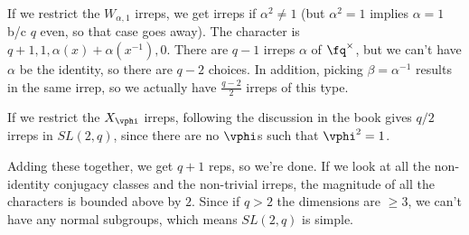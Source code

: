 \documentclass{article}
\begin{document}
If we restrict the $W_{\alpha, 1}$ irreps, we get irreps if $\alpha^2\neq 1$ (but $\alpha^2=1$ implies $\alpha=1$ b/c $q$ even, so that case goes away). The character is $q+1, 1, \alpha(x)+\alpha(x^{-1}), 0$. There are $q-1$ irreps $\alpha$ of $\fq^\times$, but we can't have $\alpha$ be the identity, so there are $q-2$ choices. In addition, picking $\beta=\alpha^{-1}$ results in the same irrep, so we actually have $\frac{q-2}{2}$ irreps of this type.

If we restrict the $X_\vphi$ irreps, following the discussion in the book gives $q/2$ irreps in $SL(2,q)$, since there are no $\vphi$s such that $\vphi^2=1$.

Adding these together, we get $q+1$ reps, so we're done.
If we look at all the non-identity conjugacy classes and the non-trivial irreps, the magnitude of all the characters is bounded above by $2$. Since if $q>2$ the dimensions are $\geq3$, we can't have any normal subgroups, which means $SL(2,q)$ is simple.
\end{document}
